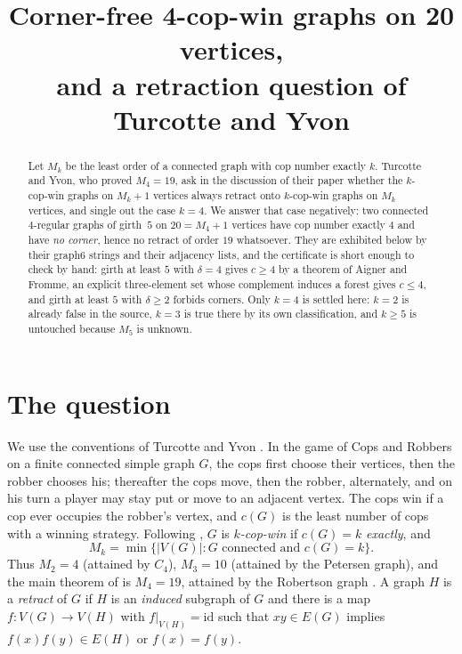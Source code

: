 \documentclass[11pt]{amsart}
\title[Corner-free 4-cop-win graphs on 20 vertices]
{Corner-free 4-cop-win graphs on 20 vertices,\\ and a retraction question of Turcotte and Yvon}
\date{}
\theoremstyle{remark}
\newcommand{\cn}{c}
\begin{document}
\begin{abstract}
Let $M_k$ be the least order of a connected graph with cop number exactly $k$. Turcotte and
Yvon, who proved $M_4=19$, ask in the discussion of their paper whether the $k$-cop-win graphs
on $M_k+1$ vertices always retract onto $k$-cop-win graphs on $M_k$ vertices, and single out
the case $k=4$. We answer that case negatively: two connected $4$-regular graphs of girth~$5$
on $20=M_4+1$ vertices have cop number exactly $4$ and have \emph{no corner}, hence no retract
of order $19$ whatsoever. They are exhibited below by their graph6 strings and their adjacency
lists, and the certificate is short enough to check by hand: girth at least $5$ with $\delta=4$
gives $\cn\ge4$ by a theorem of Aigner and Fromme, an explicit three-element set whose
complement induces a forest gives $\cn\le4$, and girth at least $5$ with $\delta\ge2$ forbids
corners. Only $k=4$ is settled here: $k=2$ is already false in the source, $k=3$ is true there
by its own classification, and $k\ge5$ is untouched because $M_5$ is unknown.
\end{abstract}

\maketitle

\section{The question}\label{sec:question}

We use the conventions of Turcotte and Yvon \cite{TY}. In the game of Cops and Robbers on a
finite connected simple graph $G$, the cops first choose their vertices, then the robber
chooses his; thereafter the cops move, then the robber, alternately, and on his turn a player
may stay put or move to an adjacent vertex. The cops win if a cop ever occupies the robber's
vertex, and $\cn(G)$ is the least number of cops with a winning strategy. Following
\cite{TY}, $G$ is \emph{$k$-cop-win} if $\cn(G)=k$ \emph{exactly}, and
\[
  M_k=\min\{|V(G)| : G \text{ connected and } \cn(G)=k\}.
\]
Thus $M_2=4$ (attained by $C_4$), $M_3=10$ (attained by the Petersen graph), and the main
theorem of \cite{TY} is $M_4=19$, attained by the Robertson graph \cite{Robertson}. A graph $H$
is a \emph{retract} of $G$ if $H$ is an \emph{induced} subgraph of $G$ and there is a map
$f\colon V(G)\to V(H)$ with $f|_{V(H)}=\mathrm{id}$ such that $xy\in E(G)$ implies
$f(x)f(y)\in E(H)$ or $f(x)=f(y)$.
\end{document}
